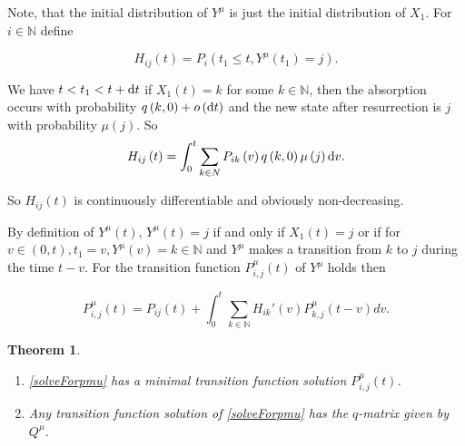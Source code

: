 \documentclass[12pt,a4paper]{scrartcl}
\newtheorem{theorem}{Theorem}[section]
\numberwithin{equation}{section}
\newcommand{\N}{\mathbb{N}} %
\begin{document}
Note, that the initial distribution of $Y^{\mu}$ is just the initial distribution of $X_1$.
For $ i \in \N$ define

$$ H_{ij}\left(t\right) = P_i\left(t_1 \leq t, Y^{\mu}\left(t_1\right) = j\right). $$


We have $ t < t_1 < t + \textnormal{d}t $ if $X_1\left(t\right) = k$ for some $k \in \N$, then the absorption occurs with probability $ q\left(k,0\right) + o\left(\textnormal{d}t\right) $ and the new state after resurrection is $j$ with probability $\mu\left(j\right)$. So
$$ H_{ij}\left(t\right) = \int_0^t \sum_{k \in N} P_{ik}\left(v\right) q\left(k,0\right) \mu\left(j\right) \textnormal{d}v. $$ 

So $ H_{ij}\left(t\right) $ is continuously differentiable and obviously non-decreasing.


By definition of $ Y^{\mu}\left(t\right) $, $ Y^{\mu}\left(t\right) = j$ if and only if $X_1\left(t\right) = j $ or if for $ v \in \left(0,t\right) , t_1 = v, Y^{\mu}\left(v\right) = k \in \N$ and $Y^{\mu}$ makes a transition from  $ k $ to $ j $ during the time $t-v$.
For the transition function $P_{i,j}^{\mu}\left(t\right)$ of $ Y^{\mu} $ holds then

\begin{equation}
P_{i,j}^{\mu}\left(t\right) = P_{ij}\left(t\right) + \int_0^t \sum_{k \in \N} H_{ik}'\left(v\right) P_{k,j}^{\mu}\left(t-v\right) dv.
\label{solveForpmu}
\end{equation}

\begin{theorem}
\begin{enumerate}
\item \eqref{solveForpmu} has a minimal transition function solution $ P_{i,j}^{\mu}\left(t\right) $.
\item Any transition function solution of \eqref{solveForpmu} has the $q$-matrix given by $Q^{\mu}$. 

\end{enumerate}
\end{theorem}
\end{document}
